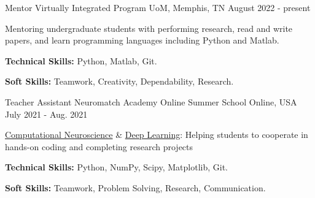 \begin{cventries}

  \cventry
    {Mentor} %
    {Virtually Integrated Program} %
    {UoM, Memphis, TN} %
    {August 2022 - present} %
    {
      \begin{cvitems} %
        \item {Mentoring undergraduate students with performing research, read and write papers, and learn programming languages including Python and Matlab.}
        \item {\textbf{Technical Skills:} Python, Matlab, Git.}
        \item {\textbf{Soft Skills:} Teamwork, Creativity, Dependability, Research.}
      \end{cvitems}
    }
  
  \cventry
    {Teacher Assistant}
    {Neuromatch Academy Online Summer School}
    {Online, USA}
    {July 2021 -  Aug. 2021}
    {
      \begin{cvitems} %
        \item{\href{https://github.com/NeuromatchAcademy/course-content-dl}{Computational Neuroscience} \& \href{https://github.com/NeuromatchAcademy/course-content-dl}{Deep Learning}: Helping students to cooperate in hands-on coding and completing research projects}
        \item {\textbf{Technical Skills:} Python, NumPy, Scipy, Matplotlib, Git.}
        \item {\textbf{Soft Skills:} Teamwork, Problem Solving, Research, Communication.}
      \end{cvitems}
    }
 

\end{cventries}
